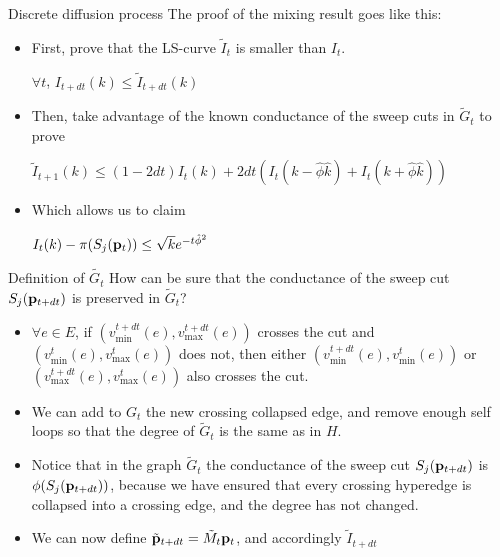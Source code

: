 \documentclass[../main.tex]{subfiles}
\begin{document}
	\begin{frame}{Discrete diffusion process}
		The proof of the mixing result goes like this:
		\begin{itemize}
				\item First, prove that the LS-curve $\tilde{I}_t$ is smaller than $I_t$. 
				\begin{lemma}
					\label{lemma:ls_curve_smaller_ls_curve_tilde}
					$\forall t$, 
					$I_{t+dt}(k) \leq \tilde{I}_{t+dt}(k)$
				\end{lemma} 
			\item Then, take advantage of the known conductance of the sweep cuts in $\tilde{G}_t$ to prove
				\begin{lemma}
					\label{lemma:recursive_LS_lower_bound}
					$\tilde{I}_{t+1}(k) \leq (1-2dt) I_t(k) + 2dt (I_t(k-\hat{\phi} \hat{k}) + I_t(k + \hat{\phi}\hat{k}))$
				\end{lemma}
			\item Which allows us to claim
				\begin{lemma}
					\label{lemma:mixing_result} 
					$I_t(k) - \pi(S_j(\bold{p}_t)) \leq \sqrt{k} e^{-t \hat{\phi}^2}$
				\end{lemma}
		\end{itemize}
	\end{frame}

	\begin{frame}{Definition of $\tilde{G_t}$}
		How can be sure that the conductance of the sweep cut $S_j(\bold{p}_{t+dt})$ is preserved in $\tilde{G}_t$?
		
		\begin{itemize}
			\item $\forall e\in E$, if $(v_{\text{min}}^{t+dt}(e), v_{\text{max}}^{t+dt}(e))$ crosses the cut and $(v_{\text{min}}^{t}(e), v_{\text{max}}^{t}(e))$ does not, then either $(v_{\text{min}}^{t+dt}(e), v_{\text{min}}^{t}(e))$ or $(v_{\text{max}}^{t+dt}(e), v_{\text{max}}^{t}(e))$ also crosses the cut.
			\item We can add to $G_t$ the new crossing collapsed edge, and remove enough self loops so that the degree of $\tilde{G}_t$ is the same as in $H$.
			\item Notice that in the graph $\tilde{G}_t$ the conductance of the sweep cut $S_j(\bold{p}_{t+dt})$ is $\phi(S_j(\bold{p}_{t+dt}))$, because we have ensured that every crossing hyperedge is collapsed into a crossing edge, and the degree has not changed.
			\item We can now define $\tilde{\bold{p}}_{t+dt} = \tilde{M}_t \bold{p}_t$, and accordingly $\tilde{I}_{t+dt}$
		\end{itemize}
	\end{frame}
\end{document}
